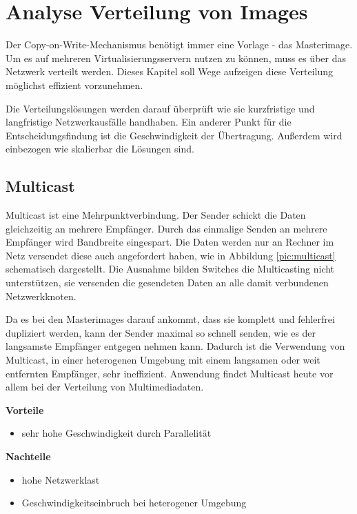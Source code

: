\chapter{Analyse Verteilung von Images}
Der Copy-on-Write-Mechanismus benötigt immer eine Vorlage - das Masterimage. Um es auf mehreren Virtualisierungsservern nutzen zu können, muss es über das Netzwerk verteilt werden. Dieses Kapitel soll Wege aufzeigen diese Verteilung möglichst effizient vorzunehmen.

Die Verteilungslösungen werden darauf überprüft wie sie kurzfristige und langfristige Netzwerkausfälle handhaben. Ein anderer Punkt für die Entscheidungsfindung ist die Geschwindigkeit der Übertragung. Außerdem wird einbezogen wie skalierbar die Lösungen sind.

\section{Multicast}
Multicast ist eine Mehrpunktverbindung. Der Sender schickt die Daten gleichzeitig an mehrere Empfänger. Durch das einmalige Senden an mehrere Empfänger wird Bandbreite eingespart. Die Daten werden nur an Rechner im Netz versendet diese auch angefordert haben, wie in Abbildung \ref{pic:multicast} schematisch dargestellt. Die Ausnahme bilden Switches die Multicasting nicht unterstützen, sie versenden die gesendeten Daten an alle damit verbundenen Netzwerkknoten. 

Da es bei den Masterimages darauf ankommt, dass sie komplett und fehlerfrei dupliziert werden, kann der Sender maximal so schnell senden, wie es der langsamste Empfänger entgegen nehmen kann.  Dadurch ist die Verwendung von Multicast, in einer heterogenen Umgebung mit einem langsamen oder weit entfernten Empfänger, sehr ineffizient. Anwendung findet Multicast heute vor allem bei der Verteilung von Multimediadaten. 


\textbf{Vorteile}
\begin{itemize}
 \item sehr hohe Geschwindigkeit durch Parallelität
\end{itemize}

\textbf{Nachteile}
\begin{itemize}
 \item hohe Netzwerklast
 \item Geschwindigkeitseinbruch bei heterogener Umgebung
\end{itemize}

